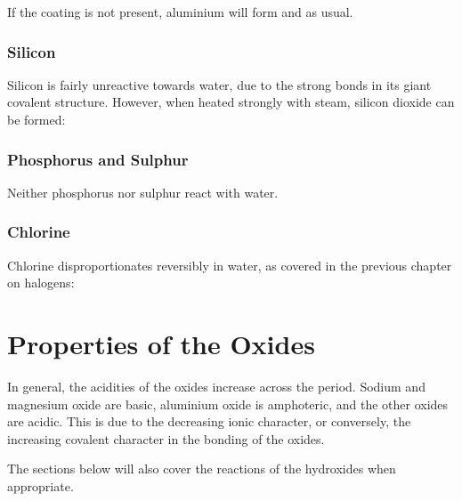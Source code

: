 				If the coating is not present, aluminium will form  and  as usual.





			\subsubsection{Silicon}

				Silicon is fairly unreactive towards water, due to the strong bonds in its giant covalent structure.
				However, when heated strongly with steam, silicon dioxide can be formed:



			\subsubsection{Phosphorus and Sulphur}

				Neither phosphorus nor sulphur react with water.


			\subsubsection{Chlorine}

				Chlorine disproportionates reversibly in water, as covered in the previous chapter on halogens:






	\pagebreak
	\section{Properties of the Oxides}

		In general, the acidities of the oxides increase across the period. Sodium and magnesium oxide are basic, aluminium oxide is
		amphoteric, and the other oxides are acidic. This is due to the decreasing ionic character, or conversely, the increasing
		covalent character in the bonding of the oxides.

		The sections below will also cover the reactions of the hydroxides when appropriate.

